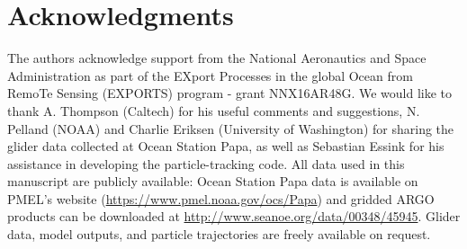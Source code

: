 \documentclass[draft,linenumbers]{agujournal2018}
\begin{document}

\section*{Acknowledgments}

The authors acknowledge support from the National Aeronautics and Space Administration as part of the EXport Processes in the global Ocean from RemoTe Sensing (EXPORTS) program - grant NNX16AR48G. We would like to thank A. Thompson (Caltech) for his useful comments and suggestions, N. Pelland (NOAA) and Charlie Eriksen (University of Washington) for sharing the glider data collected at Ocean Station Papa, as well as Sebastian Essink for his assistance in developing the particle-tracking code. All data used in this manuscript are publicly available: Ocean Station Papa data is available on PMEL's website (\url{https://www.pmel.noaa.gov/ocs/Papa}) and gridded ARGO products can be downloaded at \url{http://www.seanoe.org/data/00348/45945}. Glider data, model outputs, and particle trajectories are freely available on request. %


%



%
%


%
%
\end{document}
